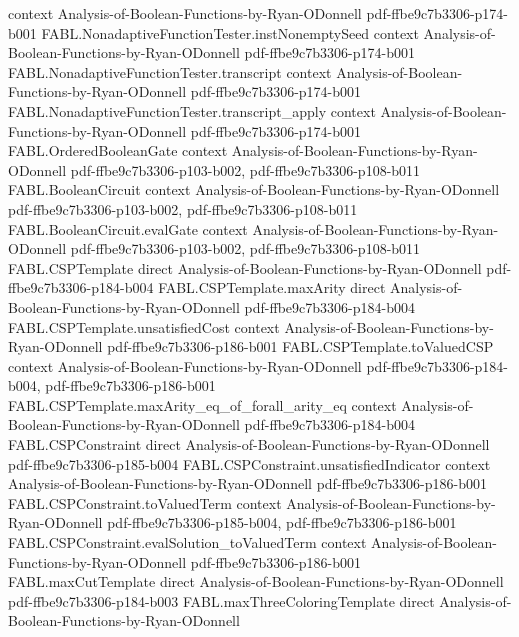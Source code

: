 \begin{theorem}
  {context}
  {Analysis-of-Boolean-Functions-by-Ryan-ODonnell}
  {pdf-ffbe9c7b3306-p174-b001}
\proofstep
  {FABL.NonadaptiveFunctionTester.instNonemptySeed}
  {context}
  {Analysis-of-Boolean-Functions-by-Ryan-ODonnell}
  {pdf-ffbe9c7b3306-p174-b001}
\proofstep
  {FABL.NonadaptiveFunctionTester.transcript}
  {context}
  {Analysis-of-Boolean-Functions-by-Ryan-ODonnell}
  {pdf-ffbe9c7b3306-p174-b001}
\proofstep
  {FABL.NonadaptiveFunctionTester.transcript_apply}
  {context}
  {Analysis-of-Boolean-Functions-by-Ryan-ODonnell}
  {pdf-ffbe9c7b3306-p174-b001}
\proofstep
  {FABL.OrderedBooleanGate}
  {context}
  {Analysis-of-Boolean-Functions-by-Ryan-ODonnell}
  {pdf-ffbe9c7b3306-p103-b002,
    pdf-ffbe9c7b3306-p108-b011}
\proofstep
  {FABL.BooleanCircuit}
  {context}
  {Analysis-of-Boolean-Functions-by-Ryan-ODonnell}
  {pdf-ffbe9c7b3306-p103-b002,
    pdf-ffbe9c7b3306-p108-b011}
\proofstep
  {FABL.BooleanCircuit.evalGate}
  {context}
  {Analysis-of-Boolean-Functions-by-Ryan-ODonnell}
  {pdf-ffbe9c7b3306-p103-b002,
    pdf-ffbe9c7b3306-p108-b011}
\proofstep
  {FABL.CSPTemplate}
  {direct}
  {Analysis-of-Boolean-Functions-by-Ryan-ODonnell}
  {pdf-ffbe9c7b3306-p184-b004}
\proofstep
  {FABL.CSPTemplate.maxArity}
  {direct}
  {Analysis-of-Boolean-Functions-by-Ryan-ODonnell}
  {pdf-ffbe9c7b3306-p184-b004}
\proofstep
  {FABL.CSPTemplate.unsatisfiedCost}
  {context}
  {Analysis-of-Boolean-Functions-by-Ryan-ODonnell}
  {pdf-ffbe9c7b3306-p186-b001}
\proofstep
  {FABL.CSPTemplate.toValuedCSP}
  {context}
  {Analysis-of-Boolean-Functions-by-Ryan-ODonnell}
  {pdf-ffbe9c7b3306-p184-b004,
    pdf-ffbe9c7b3306-p186-b001}
\proofstep
  {FABL.CSPTemplate.maxArity_eq_of_forall_arity_eq}
  {context}
  {Analysis-of-Boolean-Functions-by-Ryan-ODonnell}
  {pdf-ffbe9c7b3306-p184-b004}
\proofstep
  {FABL.CSPConstraint}
  {direct}
  {Analysis-of-Boolean-Functions-by-Ryan-ODonnell}
  {pdf-ffbe9c7b3306-p185-b004}
\proofstep
  {FABL.CSPConstraint.unsatisfiedIndicator}
  {context}
  {Analysis-of-Boolean-Functions-by-Ryan-ODonnell}
  {pdf-ffbe9c7b3306-p186-b001}
\proofstep
  {FABL.CSPConstraint.toValuedTerm}
  {context}
  {Analysis-of-Boolean-Functions-by-Ryan-ODonnell}
  {pdf-ffbe9c7b3306-p185-b004,
    pdf-ffbe9c7b3306-p186-b001}
\proofstep
  {FABL.CSPConstraint.evalSolution_toValuedTerm}
  {context}
  {Analysis-of-Boolean-Functions-by-Ryan-ODonnell}
  {pdf-ffbe9c7b3306-p186-b001}
\proofstep
  {FABL.maxCutTemplate}
  {direct}
  {Analysis-of-Boolean-Functions-by-Ryan-ODonnell}
  {pdf-ffbe9c7b3306-p184-b003}
\proofstep
  {FABL.maxThreeColoringTemplate}
  {direct}
  {Analysis-of-Boolean-Functions-by-Ryan-ODonnell}

\end{theorem}
